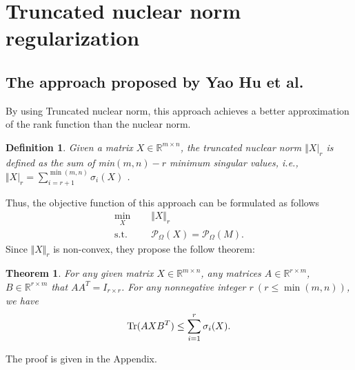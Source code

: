 \documentclass{article}
\newtheorem{definition}{Definition}[section]
\newtheorem{theorem}{Theorem}[section]
\begin{document}
{\section{Truncated nuclear norm regularization}
\label{s3}

\subsection{The approach proposed by Yao Hu et al.}
By using Truncated nuclear norm, this approach achieves a better approximation of the rank function than the nuclear norm.
\begin{definition}
	Given a matrix $X \in \mathbb{R}^{m \times n}$, the truncated nuclear norm $\Vert X \vert_r$ is defined as the sum of min$(m,n) - r$  minimum singular values, i.e., $\Vert X \vert_r = \sum_{i=r+1}^{\min(m,n)} \sigma_i(X)$ .
\end{definition}

Thus, the objective function of this approach can be formulated as follows
\begin{equation}
	\label{obj0}
	\begin{aligned}
		\underset{X}{\text{min}} \ \ \ \ &  \ \ \Vert X\Vert_r \\
		\text{s.t.} \ \ \ \ &  \ \  \mathcal{P}_{\Omega}(X) =  \mathcal{P}_{\Omega}(M).
	\end{aligned}
\end{equation}
Since $\Vert X\Vert_r$ is non-convex, they propose the follow theorem:
\begin{theorem}
	\label{thm31}
	For any given matrix $X \in \mathbb{R}^{m \times n}$, any matrices $A \in \mathbb{R}^{r \times m}$, $B \in \mathbb{R}^{r \times m}$ that $AA^T = I_{r \times r}$. For any nonnegative integer $r \ (r \leq \min(m,n))$, we have 
	\begin{equation}
		\label{eq31}
		\text{\rm Tr}(AXB^T) \leq \sum_{i=1}^r \sigma_i(X).
	\end{equation}
\end{theorem}
The proof is given in the Appendix.

}
\end{document}
